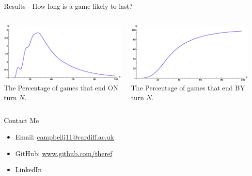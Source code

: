 \documentclass[14pt]{beamer}
\begin{document}
\begin{frame}{Results - How long is a game likely to last?}
  \begin{columns}
      \begin{center}
      \includegraphics[width=\linewidth]{images/turns}\\
      The Percentage of games that end ON turn $N$.
      \end{center}
      \begin{center}
      \includegraphics[width=\linewidth]{images/sumturns}\\
      The Percentage of games that end BY turn $N$.
      \end{center}
  \end{columns}
\end{frame}

\begin{frame}{Contact Me}
  \begin{itemize}
    \itemsep2em
    \item Email: \href{mailto:campbellj11@cardiff.ac.uk}{campbellj11@cardiff.ac.uk}

    \item GitHub: \href{https://github.com/theref}{www.github.com/theref}

    \item LinkedIn
  \end{itemize}
\end{frame}
\end{document}
